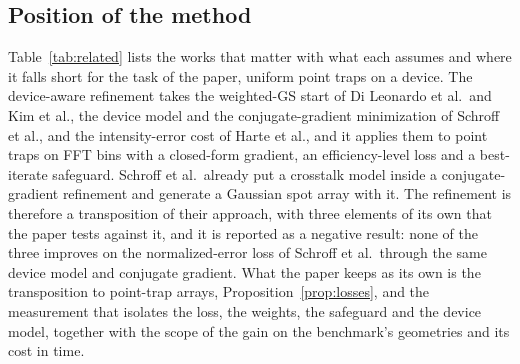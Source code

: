 \subsection{Position of the method}

Table~\ref{tab:related} lists the works that matter with what each assumes and where it falls short for the task of the paper, uniform point traps on a device. The device-aware refinement takes the weighted-GS start of Di Leonardo et al.\ and Kim et al., the device model and the conjugate-gradient minimization of Schroff et al., and the intensity-error cost of Harte et al., and it applies them to point traps on FFT bins with a closed-form gradient, an efficiency-level loss and a best-iterate safeguard. Schroff et al.\ already put a crosstalk model inside a conjugate-gradient refinement and generate a Gaussian spot array with it. The refinement is therefore a transposition of their approach, with three elements of its own that the paper tests against it, and it is reported as a negative result: none of the three improves on the normalized-error loss of Schroff et al.\ through the same device model and conjugate gradient. What the paper keeps as its own is the transposition to point-trap arrays, Proposition~\ref{prop:losses}, and the measurement that isolates the loss, the weights, the safeguard and the device model, together with the scope of the gain on the benchmark's geometries and its cost in time.

